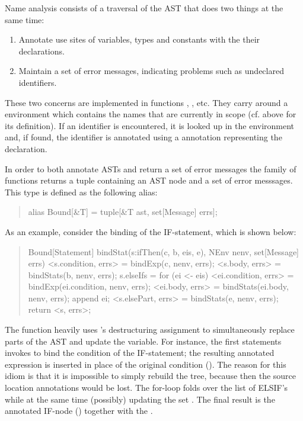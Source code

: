 \noindent Name analysis consists of a traversal of the AST that does
two things at the same time:
\begin{enumerate}
\item Annotate use sites of variables, types and constants with the
  their declarations.
\item Maintain a set of error messages, indicating problems such as
  undeclared identifiers. 
\end{enumerate}
These two concerns are implemented in functions ,
,  etc. They carry around a
 environment which contains the names that are currently
in scope (cf. above for its definition). If an identifier is
encountered, it is looked up in the environment and, if found, the
identifier is annotated using a \Rascal annotation representing the
declaration.

In order to both annotate ASTs and return a set of error messages the
 family of functions returns a tuple containing an AST
node and a set of error messsages. This type is defined as the
following \Rascal alias:
\begin{quote}
\begin{rascal}
alias Bound[&T] = tuple[&T ast, set[Message] errs];
\end{rascal}
\end{quote}

As an example, consider the binding of the IF-statement, which is
shown below:
\begin{quote}\small
\begin{rascal}
Bound[Statement] bindStat(s:ifThen(c, b, eis, e), 
                     NEnv nenv, set[Message] errs) {
    <s.condition, errs> = bindExp(c, nenv, errs);
    <s.body, errs> = bindStats(b, nenv, errs);
    s.elseIfs = for (ei <- eis) {
      <ei.condition, errs> = bindExp(ei.condition, nenv, errs);
      <ei.body, errs> = bindStats(ei.body, nenv, errs);
      append ei;
    }
    <s.elsePart, errs> = bindStats(e, nenv, errs);
    return <s, errs>;
}
\end{rascal}
\end{quote}
The function heavily uses \Rascal's destructuring assignment to
simultaneously replace parts of the AST and update the 
variable. For instance, the first statements invokes 
to bind the condition of the IF-statement; the resulting annotated
expression is inserted in place of the original condition
(). The reason for this idiom is that it is
impossible to simply rebuild the tree, because then the source
location annotations would be lost. The for-loop folds over the list
of ELSIF's while at the same time (possibly) updating the set
. The final result is the annotated IF-node
() together with the .


